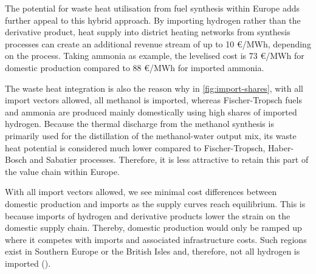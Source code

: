 
The potential for waste heat utilisation from fuel synthesis within Europe adds
further appeal to this hybrid approach. By importing hydrogen rather than the
derivative product, heat supply into district heating networks from synthesis
processes can create an additional revenue stream of up to 10 \euro{}/MWh,
depending on the process. Taking ammonia as example, the levelised cost is 73
\euro{}/MWh for domestic production compared to 88 \euro{}/MWh for imported
ammonia.

The waste heat integration is also the reason why in \cref{fig:import-shares},
with all import vectors allowed, all methanol is imported, whereas
Fischer-Tropsch fuels and ammonia are produced mainly domestically using high
shares of imported hydrogen. Because the thermal discharge from the methanol
synthesis is primarily used for the distillation of the methanol-water output
mix, its waste heat potential is considered much lower compared to
Fischer-Tropsch, Haber-Bosch and Sabatier processes. Therefore, it is less
attractive to retain this part of the value chain within Europe.


With all import vectors allowed, we see minimal cost differences between
domestic production and imports as the supply curves reach equilibrium. This is
because imports of hydrogen and derivative products lower the strain on the
domestic supply chain. Thereby, domestic production would only be ramped up
where it competes with imports and associated infrastructure costs. Such regions
exist in Southern Europe or the British Isles and, therefore, not all hydrogen
is imported ().

